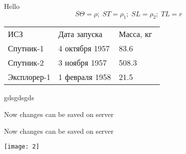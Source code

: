 \documentclass[a4paper,12pt]{article}
\begin{document}
Hello
\[S\Theta = \rho;\;ST = \rho_1;\;SL = \rho_2;\;TL = r\]
\begin{tabular}{ l l l }
ИСЗ & Дата запуска & Масса, кг  \\
Спутник-1 & 4 октября 1957 & 83.6 \\
Спутник-2 & 3 ноября 1957 & 508.3  \\
Эксплорер-1 & 1 февраля 1958 & 21.5 \\
\end{tabular}

gdsgdsgds
\newline

Now changes can be saved on server




Now changes can be saved on server



\texttt{[image: 2]}
\end{document}
